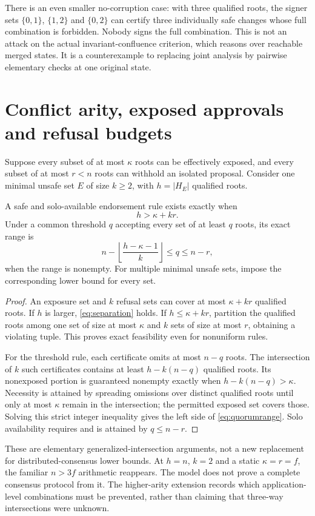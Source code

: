 \documentclass[11pt,a4paper]{article}
\theoremstyle{definition}\newtheorem{definition}{Definition}
\newcommand{\idtag}[1]{\textnormal{\textsf{[#1]}}}
\begin{document}
There is an even smaller no-corruption case: with three qualified roots, the signer sets $\{0,1\}$, $\{1,2\}$ and $\{0,2\}$ can certify three individually safe changes whose full combination is forbidden. Nobody signs the full combination. This is not an attack on the actual invariant-confluence criterion, which reasons over reachable merged states. It is a counterexample to replacing joint analysis by pairwise elementary checks at one original state.

\section{Conflict arity, exposed approvals and refusal budgets}
\label{sec:threshold}
Suppose every subset of at most $\kappa$ roots can be effectively exposed, and every subset of at most $r<n$ roots can withhold an isolated proposal. Consider one minimal unsafe set $E$ of size $k\ge2$, with $h=|H_E|$ qualified roots.

\begin{corollary}[Exact feasibility and uniform thresholds \idtag{JPA-T3}]
\label{cor:threshold}
A safe and solo-available endorsement rule exists exactly when
\begin{equation}
\boxed{h>\kappa+kr.}
\label{eq:cardinality}
\end{equation}
Under a common threshold $q$ accepting every set of at least $q$ roots, its exact range is
\begin{equation}
\boxed{n-\left\lfloor\frac{h-\kappa-1}{k}\right\rfloor\le q\le n-r,}
\label{eq:quorumrange}
\end{equation}
when the range is nonempty. For multiple minimal unsafe sets, impose the corresponding lower bound for every set.
\end{corollary}
\begin{proof}
An exposure set and $k$ refusal sets can cover at most $\kappa+kr$ qualified roots. If $h$ is larger, \cref{eq:separation} holds. If $h\le\kappa+kr$, partition the qualified roots among one set of size at most $\kappa$ and $k$ sets of size at most $r$, obtaining a violating tuple. This proves exact feasibility even for nonuniform rules.

For the threshold rule, each certificate omits at most $n-q$ roots. The intersection of $k$ such certificates contains at least $h-k(n-q)$ qualified roots. Its nonexposed portion is guaranteed nonempty exactly when $h-k(n-q)>\kappa$. Necessity is attained by spreading omissions over distinct qualified roots until only at most $\kappa$ remain in the intersection; the permitted exposed set covers those. Solving this strict integer inequality gives the left side of \cref{eq:quorumrange}. Solo availability requires and is attained by $q\le n-r$.
\end{proof}
These are elementary generalized-intersection arguments, not a new replacement for distributed-consensus lower bounds. At $h=n$, $k=2$ and a static $\kappa=r=f$, the familiar $n>3f$ arithmetic reappears. The model does not prove a complete consensus protocol from it. The higher-arity extension records which application-level combinations must be prevented, rather than claiming that three-way intersections were unknown.
\end{document}
